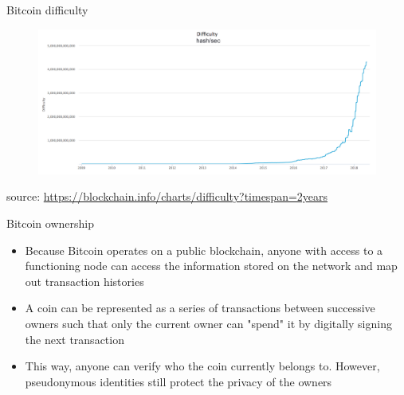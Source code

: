 \documentclass[11pt]{beamer}
\begin{document}

\begin{frame}{Bitcoin difficulty}
	\begin{figure}[]
		\centering
		\includegraphics  [scale=0.2]{Images/difficulty}
	\end{figure}
		\begin{scriptsize}
		source: \href{https://blockchain.info/charts/difficulty?timespan=2years}{https://blockchain.info/charts/difficulty?timespan=2years}
	\end{scriptsize}
\end{frame}


\begin{frame}{Bitcoin ownership}
	\begin{itemize}
		\item Because Bitcoin operates on a public blockchain, anyone with access to a functioning node can access the information stored on the network and map out transaction histories
		\item A coin can be represented as a series of transactions between successive owners such that only the current owner can "spend" it by digitally signing the next transaction
		\item This way, anyone can verify who the coin currently belongs to. However, pseudonymous identities still protect the privacy of the owners
	\end{itemize}
\end{frame}

\end{document}
